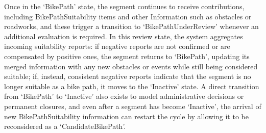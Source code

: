 Once in the ‘BikePath’ state, the segment continues to receive contributions, including BikePathSuitability items and other Information such as obstacles or roadworks, and these trigger a transition to ‘BikePathUnderReview’ whenever an additional evaluation is required. In this review state, the system aggregates incoming suitability reports: if negative reports are not confirmed or are compensated by positive ones, the segment returns to ‘BikePath’, updating its merged information with any new obstacles or events while still being considered suitable; if, instead, consistent negative reports indicate that the segment is no longer suitable as a bike path, it moves to the ‘Inactive’ state. A direct transition from ‘BikePath’ to ‘Inactive’ also exists to model administrative decisions or permanent closures, and even after a segment has become ‘Inactive’, the arrival of new BikePathSuitability information can restart the cycle by allowing it to be reconsidered as a ‘CandidateBikePath’.

